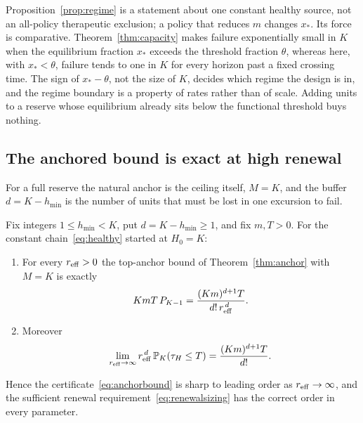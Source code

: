 Proposition~\ref{prop:regime} is a statement about one constant healthy source, not an all-policy therapeutic exclusion; a policy that reduces $m$ changes $x_*$. Its force is comparative. Theorem~\ref{thm:capacity} makes failure exponentially small in $K$ when the equilibrium fraction $x_*$ exceeds the threshold fraction $\theta$, whereas here, with $x_*<\theta$, failure tends to one in $K$ for every horizon past a fixed crossing time. The sign of $x_*-\theta$, not the size of $K$, decides which regime the design is in, and the regime boundary is a property of rates rather than of scale. Adding units to a reserve whose equilibrium already sits below the functional threshold buys nothing.

\subsection{The anchored bound is exact at high renewal}\label{sec:highrenewal}
For a full reserve the natural anchor is the ceiling itself, $M=K$, and the buffer $d=K-h_{\min}$ is the number of units that must be lost in one excursion to fail.

\begin{proposition}\label{prop:highrenewal}
Fix integers $1\le h_{\min}<K$, put $d=K-h_{\min}\ge1$, and fix $m,T>0$. For the constant chain~\eqref{eq:healthy} started at $H_0=K$:
\begin{enumerate}\itemsep2pt
\item[(i)] For every $r_{\mathrm{eff}}>0$ the top-anchor bound of Theorem~\ref{thm:anchor} with $M=K$ is exactly
\begin{equation}\label{eq:topexact}
 KmT\,P_{K-1}=\frac{(Km)^{d+1}T}{d!\,r_{\mathrm{eff}}^{\,d}}.
\end{equation}
\item[(ii)] Moreover
\begin{equation}\label{eq:limit}
 \lim_{r_{\mathrm{eff}}\to\infty}r_{\mathrm{eff}}^{\,d}\,\mathbb P_K(\tau_H\le T)
 =\frac{(Km)^{d+1}T}{d!}.
\end{equation}
\end{enumerate}
Hence the certificate~\eqref{eq:anchorbound} is sharp to leading order as $r_{\mathrm{eff}}\to\infty$, and the sufficient renewal requirement~\eqref{eq:renewalsizing} has the correct order in every parameter.
\end{proposition}


